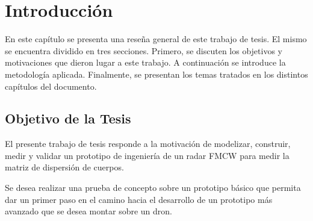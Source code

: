 
\chapter{Introducción}  %

\ifpdf
    \graphicspath{{Chapter1/Figs/Raster/}{Chapter1/Figs/PDF/}{Chapter1/Figs/}}
\else
    \graphicspath{{Chapter1/Figs/Vector/}{Chapter1/Figs/}}
\fi

En este capítulo se presenta una reseña general de este trabajo de tesis. El mismo se encuentra dividido en tres secciones. Primero, se discuten los objetivos y motivaciones que dieron lugar a este trabajo. A continuación se introduce la metodología aplicada. Finalmente, se presentan los temas tratados en los distintos capítulos del documento.

\section{Objetivo de la Tesis} \label{sc:objective}

El presente trabajo de tesis responde a la motivación de modelizar, construir, medir y validar un prototipo de ingeniería de un radar FMCW para medir la matriz de dispersión de cuerpos. 

Se desea realizar una prueba de concepto sobre un prototipo básico que permita dar un primer paso en el camino hacia el desarrollo de un prototipo más avanzado que se desea montar sobre un dron.





